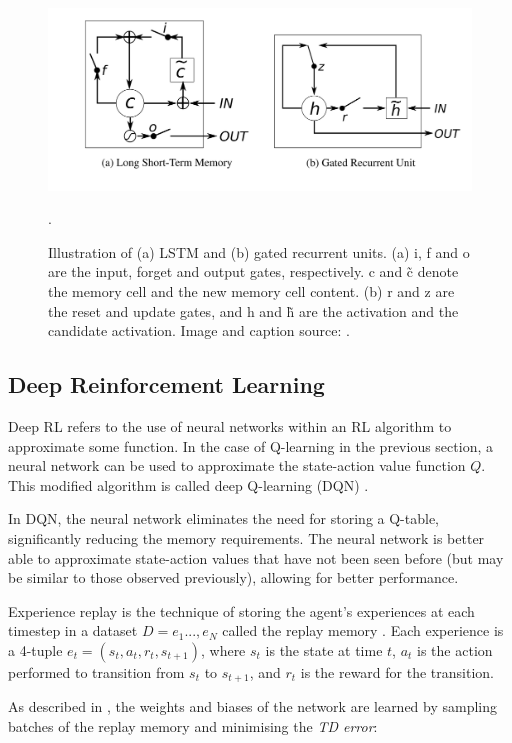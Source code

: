 \begin{figure}
    \centering
    \includegraphics[scale = 0.2]{images/rnn.png}
    \caption{Illustration of (a) LSTM and (b) gated recurrent units. (a) i, f and o are the input, forget and output gates, respectively. c and \~c denote the memory cell and the new memory cell content. (b) r and z are the reset and update gates, and h and \~h are the activation and the candidate activation. Image and caption source: \cite{rnn}.}.
    \label{fig:rnn}
\end{figure}

\subsection{Deep Reinforcement Learning}

Deep RL refers to the use of neural networks within an RL algorithm to approximate some function. In the case of Q-learning in the previous section, a neural network can be used to approximate the state-action value function $Q$. This modified algorithm is called deep Q-learning (DQN) \cite{dqn}.

In DQN, the neural network eliminates the need for storing a Q-table, significantly reducing the memory requirements. The neural network is better able to approximate state-action values that have not been seen before (but may be similar to those observed previously), allowing for better performance.

Experience replay \cite{expeirnecereplay} is the technique of storing the agent's experiences at each timestep in a dataset $D = e_1..., e_N$ called the replay memory \cite{dqn}. Each experience is a 4-tuple $e_t = (s_t, a_t, r_t, s_{t+1})$, where $s_t$ is the state at time $t$, $a_t$ is the action performed to transition from $s_t$ to $s_{t+1}$, and $r_t$ is the reward for the transition.

As described in \cite{qmixcite}, the weights and biases of the network are learned by sampling batches of the replay memory and minimising the \textit{TD error}:


